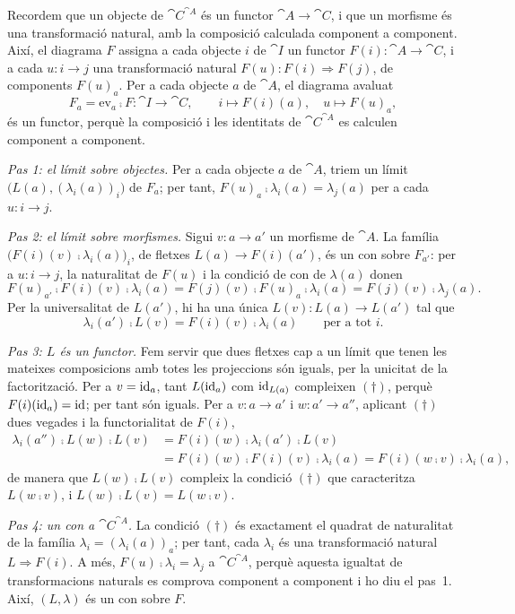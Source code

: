 \begin{prova}
Recordem que un objecte de $\cat{C}^{\cat{A}}$ és un functor $\cat{A}\to\cat{C}$, i que un morfisme és una transformació natural, amb la composició calculada component a component. Així, el diagrama $F$ assigna a cada objecte $i$ de $\cat{I}$ un functor $F(i)\colon\cat{A}\to\cat{C}$, i a cada $u\colon i\to j$ una transformació natural $F(u)\colon F(i)\Rightarrow F(j)$, de components $F(u)_a$. Per a cada objecte $a$ de $\cat{A}$, el diagrama avaluat
\[
F_a=\mathrm{ev}_a\comp F\colon\cat{I}\to\cat{C},\qquad i\mapsto F(i)(a),\quad u\mapsto F(u)_a,
\]
és un functor, perquè la composició i les identitats de $\cat{C}^{\cat{A}}$ es calculen component a component.

\emph{Pas 1: el límit sobre objectes.} Per a cada objecte $a$ de $\cat{A}$, triem un límit $\bigl(L(a),(\lambda_i(a))_i\bigr)$ de $F_a$; per tant, $F(u)_a\comp\lambda_i(a)=\lambda_j(a)$ per a cada $u\colon i\to j$.

\emph{Pas 2: el límit sobre morfismes.} Sigui $v\colon a\to a'$ un morfisme de $\cat{A}$. La família $\bigl(F(i)(v)\comp\lambda_i(a)\bigr)_i$, de fletxes $L(a)\to F(i)(a')$, és un con sobre $F_{a'}$: per a $u\colon i\to j$, la naturalitat de $F(u)$ i la condició de con de $\lambda(a)$ donen
\[
F(u)_{a'}\comp F(i)(v)\comp\lambda_i(a)=F(j)(v)\comp F(u)_a\comp\lambda_i(a)=F(j)(v)\comp\lambda_j(a).
\]
Per la universalitat de $L(a')$, hi ha una única $L(v)\colon L(a)\to L(a')$ tal que
\[
\lambda_i(a')\comp L(v)=F(i)(v)\comp\lambda_i(a)\qquad\text{per a tot } i.
\tag{$\dagger$}
\]

\emph{Pas 3: $L$ és un functor.} Fem servir que dues fletxes cap a un límit que tenen les mateixes composicions amb totes les projeccions són iguals, per la unicitat de la factorització. Per a $v=\operatorname{id}_a$, tant $L(\operatorname{id}_a)$ com $\operatorname{id}_{L(a)}$ compleixen $(\dagger)$, perquè $F(i)(\operatorname{id}_a)=\operatorname{id}$; per tant són iguals. Per a $v\colon a\to a'$ i $w\colon a'\to a''$, aplicant $(\dagger)$ dues vegades i la functorialitat de $F(i)$,
\[
\begin{aligned}
\lambda_i(a'')\comp L(w)\comp L(v)&=F(i)(w)\comp\lambda_i(a')\comp L(v)\\
&=F(i)(w)\comp F(i)(v)\comp\lambda_i(a)=F(i)(w\comp v)\comp\lambda_i(a),
\end{aligned}
\]
de manera que $L(w)\comp L(v)$ compleix la condició $(\dagger)$ que caracteritza $L(w\comp v)$, i $L(w)\comp L(v)=L(w\comp v)$.

\emph{Pas 4: un con a $\cat{C}^{\cat{A}}$.} La condició $(\dagger)$ és exactament el quadrat de naturalitat de la família $\lambda_i=(\lambda_i(a))_a$; per tant, cada $\lambda_i$ és una transformació natural $L\Rightarrow F(i)$. A més, $F(u)\comp\lambda_i=\lambda_j$ a $\cat{C}^{\cat{A}}$, perquè aquesta igualtat de transformacions naturals es comprova component a component i ho diu el pas~1. Així, $(L,\lambda)$ és un con sobre $F$.


\end{prova}
